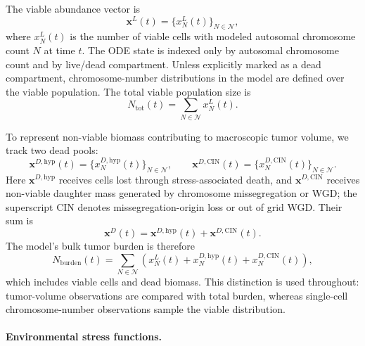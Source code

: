 \documentclass[11pt]{article}
\begin{document}
The viable abundance vector is
\begin{equation}
\mathbf{x}^L(t)=\{x_N^L(t)\}_{N\in\mathcal N},
\label{eq:appendix_viable_vector}
\end{equation}
where $x_N^L(t)$ is the number of viable cells with modeled autosomal chromosome count $N$ at time $t$. The ODE state is indexed only by autosomal chromosome count and by live/dead compartment. Unless explicitly marked as a dead compartment, chromosome-number distributions in the model are defined over the viable population. The total viable population size is
\begin{equation}
N_{\mathrm{tot}}(t)=\sum_{N\in\mathcal N}x_N^L(t).
\label{eq:appendix_total_viable_population}
\end{equation}

To represent non-viable biomass contributing to macroscopic tumor volume, we track two dead pools:
\begin{equation}
\mathbf{x}^{D,\mathrm{hyp}}(t)=\{x_{N}^{D,\mathrm{hyp}}(t)\}_{N\in\mathcal N},
\qquad
\mathbf{x}^{D,\mathrm{CIN}}(t)=\{x_{N}^{D,\mathrm{CIN}}(t)\}_{N\in\mathcal N}.
\label{eq:appendix_dead_pools}
\end{equation}
Here $\mathbf{x}^{D,\mathrm{hyp}}$ receives cells lost through stress-associated death, and $\mathbf{x}^{D,\mathrm{CIN}}$ receives non-viable daughter mass generated by chromosome missegregation or WGD; the superscript $\mathrm{CIN}$ denotes missegregation-origin loss or out of grid WGD. Their sum is
\begin{equation}
\mathbf{x}^{D}(t)=\mathbf{x}^{D,\mathrm{hyp}}(t)+\mathbf{x}^{D,\mathrm{CIN}}(t).
\label{eq:appendix_total_dead_pool}
\end{equation}
The model's bulk tumor burden is therefore
\begin{equation}
N_{\mathrm{burden}}(t)
=
\sum_{N\in\mathcal N}
\left(x_{N}^L(t)+x_{N}^{D,\mathrm{hyp}}(t)+x_{N}^{D,\mathrm{CIN}}(t)\right),
\label{eq:appendix_tumor_burden}
\end{equation}
which includes viable cells and dead biomass. This distinction is used throughout: tumor-volume observations are compared with total burden, whereas single-cell chromosome-number observations sample the viable distribution.

\paragraph{Environmental stress functions.}
\end{document}

